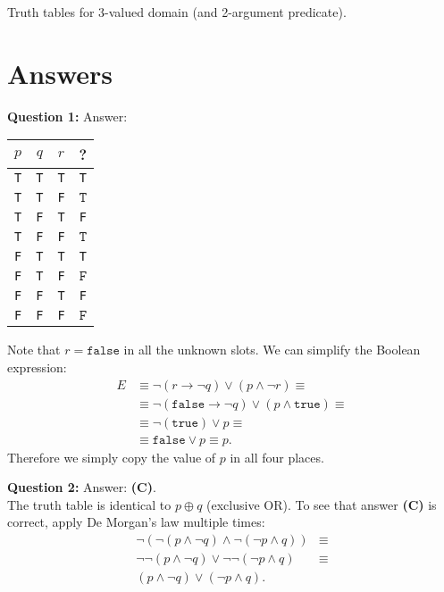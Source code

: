 \documentclass[jou]{apa6}
\begin{document}
{Truth tables for 3-valued domain (and 2-argument predicate). 



\newpage 

\section{Answers}


{\bf Question 1:} Answer:

\begin{tabular}{ c | c | c | c }
$p$ & $q$ & $r$ & ? \\ \hline
{\tt T} & {\tt T} & {\tt T} & {\tt T} \\ \hline
{\tt T} & {\tt T} & {\tt F} & $\boxed{\mathtt{T}}$ \\ \hline
{\tt T} & {\tt F} & {\tt T} & {\tt F} \\ \hline
{\tt T} & {\tt F} & {\tt F} & $\boxed{\mathtt{T}}$ \\ \hline
{\tt F} & {\tt T} & {\tt T} & {\tt T} \\ \hline
{\tt F} & {\tt T} & {\tt F} & $\boxed{\mathtt{F}}$ \\ \hline
{\tt F} & {\tt F} & {\tt T} & {\tt F} \\ \hline
{\tt F} & {\tt F} & {\tt F} & $\boxed{\mathtt{F}}$ \\ \hline
\end{tabular}

\vspace{3pt}
\noindent
Note that $r=\mathtt{false}$ in all the unknown slots. 
We can simplify the Boolean expression:
\begin{align}
E & \equiv \neg(r \rightarrow \neg q) \vee (p \wedge \neg r) \equiv \nonumber \\
  & \equiv \neg(\mathtt{false} \rightarrow \neg q) \vee 
(p \wedge \mathtt{true}) \equiv  \nonumber \\
  & \equiv \neg(\mathtt{true}) \vee p \equiv \nonumber \\
  & \equiv \mathtt{false} \vee p \equiv p. \nonumber
\end{align}
Therefore we simply copy the value of $p$ in all four places.

\vspace{10pt}
{\bf Question 2:} Answer: {\bf (C)}.\\
The truth table is identical to $p \oplus q$ (exclusive OR). 
To see that answer {\bf (C)} is correct, apply De Morgan's law multiple times:
\begin{align}
\neg (\neg ( p \wedge \neg q) \wedge \neg (\neg p \wedge q)) & \equiv \nonumber \\
\neg \neg (p \wedge \neg q) \vee \neg \neg (\neg p \wedge q) & \equiv \nonumber \\
(p \wedge \neg q) \vee (\neg p \wedge q). & \nonumber
\end{align}

}
\end{document}
